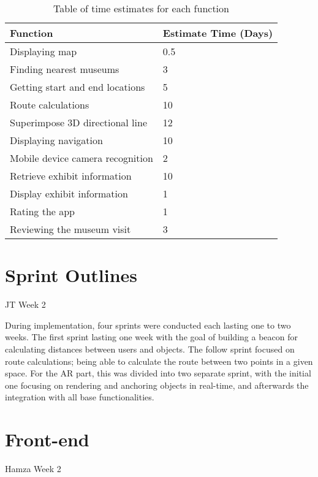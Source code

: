 \begingroup
\renewcommand{\arraystretch}{1.5} %
\begin{table}[H]
\begin{tabular}{l|l}
\textbf{Function}                & \textbf{Estimate Time (Days)} \\ \hline
Displaying map                   & 0.5                           \\
Finding nearest museums          & 3                             \\
Getting start and end locations  & 5                             \\
Route calculations               & 10                            \\
Superimpose 3D directional line  & 12                            \\
Displaying navigation            & 10                            \\
Mobile device camera recognition & 2                             \\
Retrieve exhibit information     & 10                            \\
Display exhibit information      & 1                             \\
Rating the app                   & 1                             \\
Reviewing the museum visit       & 3                             
\end{tabular}
\caption{Table of time estimates for each function}
\label{table:timeestimates}
\end{table}
\endgroup

\section{Sprint Outlines}
JT Week 2

During implementation, four sprints were conducted each lasting one to two weeks. The first sprint lasting one week with the goal of building a beacon for calculating distances between users and objects. The follow sprint focused on route calculations; being able to calculate the route between two points in a given space. For the AR part, this was divided into two separate sprint, with the initial one focusing on rendering and anchoring objects in real-time, and afterwards the integration with all base functionalities.

\section{Front-end}
Hamza Week 2

